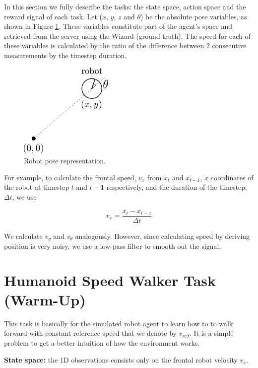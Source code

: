 In this section we fully describe the tasks: the state space, action space and the reward signal of each task.
Let ($x$, $y$, $z$ and $\theta$) be the absolute pose variables, as shown in Figure \ref{fig:robotpos}. 
These variables constitute part of the agent's space and retrieved from the server using the Wizard (ground truth).
The speed for each of these variables is calculated by the ratio of the difference between $2$ consecutive measurements by the timestep duration.

\begin{figure}[H]
    \centering
    \includegraphics[width=0.4\textwidth]{Chapter6/robot_pos.pdf}
    \caption{Robot pose representation.}
    \label{fig:robotpos}
\end{figure}

For example, to calculate the frontal speed, $v_x$ from $x_t$ and $x_{t-1}$, $x$ coordinates of the robot at timestep $t$ and $t-1$ respectively,
and the duration of the timestep, $\Delta t$, we use 

\begin{align*}
    v_x = \dfrac{x_t - x_{t-1}}{\Delta t}
\end{align*}

We calculate $v_y$ and $v_{\theta}$ analogously.
However, since calculating speed by deriving position is very noisy, we use a low-pass filter to smooth out the signal. 

\section{Humanoid Speed Walker Task (Warm-Up)}

This task is basically for the simulated robot agent to learn how to to walk forward with constant reference speed that we denote by $v_{ref}$.
It is a simple problem to get a better intuition of how the environment works.

\textbf{State space:} the 1D observations consists only on the frontal robot velocity $v_x$.

